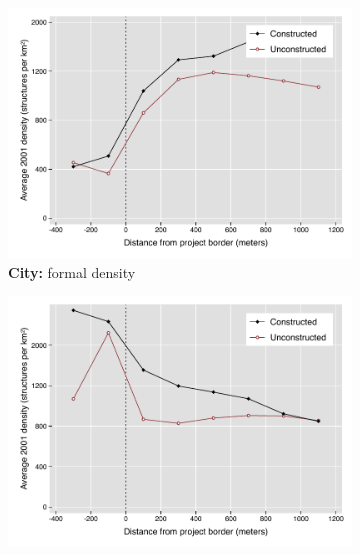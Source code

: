 \documentclass[12pt]{article}
\begin{document}
\begin{figure}[h!]
        \centering
        \caption[ Pre-Period Housing Densities in Constructed and Unconstructed Projects: City versus Suburb]
        {\small Pre-Period Housing Densities in Constructed and Unconstructed Projects: City versus Suburb} 
        \begin{subfigure}[b]{0.495\textwidth}
            \centering
            \includegraphics[width=\textwidth,trim={0.3cm .3cm 0.1cm 0cm}, clip=true]{figures/bblu_for_pre_means_het_near_5.pdf}
            \caption[Network2]%
            {{\small \textbf{City:} formal density}}    
            \label{fig:prefor_near_het}
        \end{subfigure}
        \hfill
        \begin{subfigure}[b]{0.495\textwidth}  
            \centering 
            \includegraphics[width=\textwidth,trim={0.3cm .3cm 0.1cm 0cm}, clip=true]{figures/bblu_inf_pre_means_het_near_5.pdf}

\end{subfigure}
\end{figure}
\end{document}
